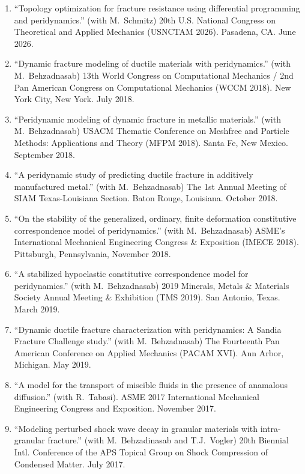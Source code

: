 \begin{etaremune}
\else
\begin{enumerate}
\fi
  \item ``Topology optimization for fracture resistance using differential programming and peridynamics.'' (with M.\ Schmitz) 20th U.S. National Congress on Theoretical and Applied Mechanics (USNCTAM 2026). Pasadena, CA. June 2026.
  \item ``Dynamic fracture modeling of ductile materials with peridynamics.'' (with M.\ Behzadnasab) 13th World Congress on Computational Mechanics / 2nd Pan American Congress on Computational Mechanics (WCCM 2018). New York City, New York. July 2018.
  \item ``Peridynamic modeling of dynamic fracture in metallic materials.'' (with M.\ Behzadnasab) USACM Thematic Conference on Meshfree and Particle Methods: Applications and Theory (MFPM 2018). Santa Fe, New Mexico. September 2018.
  \item ``A peridynamic study of predicting ductile fracture in additively manufactured metal.'' (with M.\ Behzadnasab) The 1st Annual Meeting of SIAM Texas-Louisiana Section. Baton Rouge, Louisiana. October 2018. 
  \item ``On the stability of the generalized, ordinary, finite deformation constitutive correspondence model of peridynamics.'' (with M.\ Behzadnasab) ASME's International Mechanical Engineering Congress \& Exposition (IMECE 2018). Pittsburgh, Pennsylvania, November 2018.
  \item ``A stabilized hypoelastic constitutive correspondence model for peridynamics.'' (with M.\ Behzadnasab) 2019 Minerals, Metals \& Materials Society Annual Meeting \& Exhibition (TMS 2019). San Antonio, Texas. March 2019.
  \item ``Dynamic ductile fracture characterization with peridynamics: A Sandia Fracture Challenge study.'' (with M.\ Behzadnasab) The Fourteenth Pan American Conference on Applied Mechanics (PACAM XVI). Ann Arbor, Michigan. May 2019.
  \item ``A model for the transport of miscible fluids in the presence of anamalous diffusion.'' (with R.\ Tabasi).  ASME 2017 International Mechanical Engineering Congress and Exposition. November 2017.
  \item ``Modeling perturbed shock wave decay in granular materials with intra-granular fracture.'' (with M.\ Behzadinasab and T.J.\ Vogler) 20th Biennial Intl. Conference of the APS Topical Group on Shock Compression of Condensed Matter. July 2017.

\end{enumerate}
\end{etaremune}

